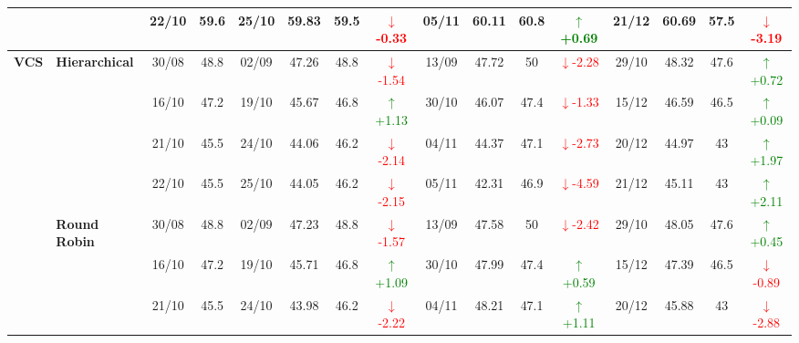 {\begin{longtable}{llcc|cccc|cccc|cccc}
&
& 22/10 & 59.6 & 25/10 & 59.83 & 59.5 & \textcolor{red}{\(\downarrow\)-0.33} & 05/11 & 60.11 & 60.8 & \textcolor{green}{\(\uparrow\)+0.69} & 21/12 & 60.69 & 57.5 & \textcolor{red}{\(\downarrow\)-3.19} \\
\midrule



\multirow{12}{*}{\textbf{VCS}} 
& \textbf{Hierarchical}
& 30/08 & 48.8 & 02/09 & 47.26 & 48.8 & \textcolor{red}{\(\downarrow\)-1.54} & 13/09 & 47.72 & 50 & \textcolor{red}{\(\downarrow\)-2.28} & 29/10 & 48.32 & 47.6 & \textcolor{green}{\(\uparrow\)+0.72} \\

&
& 16/10 & 47.2 & 19/10 & 45.67 & 46.8 & \textcolor{green}{\(\uparrow\)+1.13} & 30/10 & 46.07 & 47.4 & \textcolor{red}{\(\downarrow\)-1.33} & 15/12 & 46.59 & 46.5 & \textcolor{green}{\(\uparrow\)+0.09} \\

&
& 21/10 & 45.5 & 24/10 & 44.06 & 46.2 & \textcolor{red}{\(\downarrow\)-2.14} & 04/11 & 44.37 & 47.1 & \textcolor{red}{\(\downarrow\)-2.73} & 20/12 & 44.97 & 43 & \textcolor{green}{\(\uparrow\)+1.97} \\

&
& 22/10 & 45.5 & 25/10 & 44.05 & 46.2 & \textcolor{red}{\(\downarrow\)-2.15} & 05/11 & 42.31 & 46.9 & \textcolor{red}{\(\downarrow\)-4.59} & 21/12 & 45.11 & 43 & \textcolor{green}{\(\uparrow\)+2.11} \\
\cmidrule(lr){2-16}


& \textbf{Round Robin}
& 30/08 & 48.8 & 02/09 & 47.23 & 48.8 & \textcolor{red}{\(\downarrow\)-1.57} & 13/09 & 47.58 & 50 & \textcolor{red}{\(\downarrow\)-2.42} & 29/10 & 48.05 & 47.6 & \textcolor{green}{\(\uparrow\)+0.45} \\

&
& 16/10 & 47.2 & 19/10 & 45.71 & 46.8 & \textcolor{green}{\(\uparrow\)+1.09} & 30/10 & 47.99 & 47.4 & \textcolor{green}{\(\uparrow\)+0.59} & 15/12 & 47.39 & 46.5 & \textcolor{red}{\(\downarrow\)-0.89} \\

&
& 21/10 & 45.5 & 24/10 & 43.98 & 46.2 & \textcolor{red}{\(\downarrow\)-2.22} & 04/11 & 48.21 & 47.1 & \textcolor{green}{\(\uparrow\)+1.11} & 20/12 & 45.88 & 43 & \textcolor{red}{\(\downarrow\)-2.88} \\


\end{longtable}}
